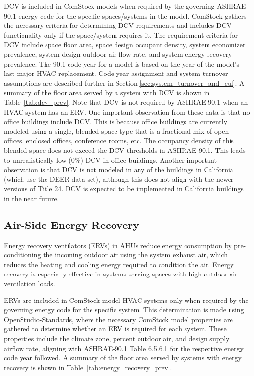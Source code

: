 DCV is included in ComStock models when required by the governing ASHRAE-90.1 energy code for the specific spaces/systems in the model. ComStock gathers the necessary criteria for determining DCV requirements and includes DCV functionality only if the space/system requires it. The requirement criteria for DCV include space floor area, space design occupant density, system economizer prevalence, system design outdoor air flow rate, and system energy recovery prevalence. The 90.1 code year for a model is based on the year of the model's last major HVAC replacement. Code year assignment and system turnover assumptions are described further in Section \ref{sec:system_turnover_and_eul}. A summary of the floor area served by a system with DCV is shown in Table~\ref{tab:dcv_prev}. Note that DCV is not required by ASHRAE 90.1 when an HVAC system has an ERV. One important observation from these data is that no office buildings include DCV. This is because office buildings are currently modeled using a single, blended space type that is a fractional mix of open offices, enclosed offices, conference rooms, etc. The occupancy density of this blended space does not exceed the DCV thresholds in ASHRAE 90.1. This leads to unrealistically low (0\%) DCV in office buildings. Another important observation is that DCV is not modeled in any of the buildings in California (which use the DEER data set), although this does not align with the newer versions of Title 24. DCV is expected to be implemented in California buildings in the near future. 


\subsection{Air-Side Energy Recovery}
\label{sec:erv}

Energy recovery ventilators (ERVs) in AHUs reduce energy consumption by pre-conditioning the incoming outdoor air using the system exhaust air, which reduces the heating and cooling energy required to condition the air. Energy recovery is especially effective in systems serving spaces with high outdoor air ventilation loads.

ERVs are included in ComStock model HVAC systems only when required by the governing energy code for the specific system. This determination is made using OpenStudio-Standards, where the necessary ComStock model properties are gathered to determine whether an ERV is required for each system. These properties include the climate zone, percent outdoor air, and design supply airflow rate, aligning with ASHRAE-90.1 Table 6.5.6.1 for the respective energy code year followed. A summary of the floor area served by systems with energy recovery is shown in Table~\ref{tab:energy_recovery_prev}.

